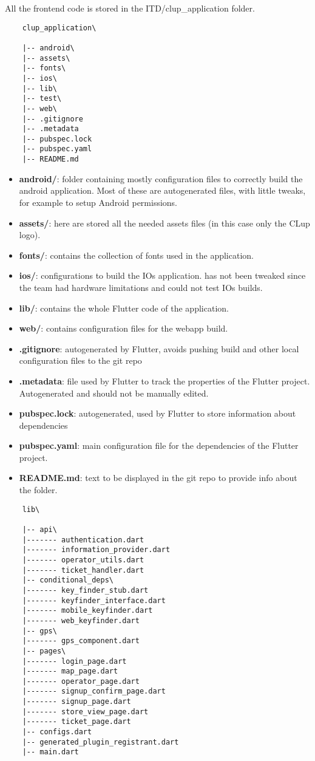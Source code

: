 All the frontend code is stored in the ITD/clup\_application folder.

\begin{lstlisting}
    clup_application\

    |-- android\
    |-- assets\
    |-- fonts\
    |-- ios\
    |-- lib\
    |-- test\
    |-- web\
    |-- .gitignore
    |-- .metadata
    |-- pubspec.lock
    |-- pubspec.yaml
    |-- README.md 

\end{lstlisting}

\begin{itemize}
    \item \textbf{android/}: folder containing mostly configuration files to correctly build the android application. Most of these are autogenerated files, with little tweaks, for example to setup Android permissions.
    \item \textbf{assets/}: here are stored all the needed assets files (in this case only the CLup logo).
    \item \textbf{fonts/}: contains the collection of fonts used in the application.
    \item \textbf{ios/}: configurations to build the IOs application. has not been tweaked since the team had hardware limitations and could not test IOs builds.
    \item \textbf{lib/}: contains the whole Flutter code of the application.
    \item \textbf{web/}: contains configuration files for the webapp build.
    \item \textbf{.gitignore}: autogenerated by Flutter, avoids pushing build and other local configuration files to the git repo
    \item \textbf{.metadata}: file used by Flutter to track the properties of the Flutter project. Autogenerated and should not be manually edited.
    \item \textbf{pubspec.lock}: autogenerated, used by Flutter to store information about dependencies
    \item \textbf{pubspec.yaml}: main configuration file for the dependencies of the Flutter project.
    \item \textbf{README.md}: text to be displayed in the git repo to provide info about the folder.
\end{itemize}

\begin{lstlisting}
    lib\

    |-- api\
    |------- authentication.dart
    |------- information_provider.dart
    |------- operator_utils.dart
    |------- ticket_handler.dart
    |-- conditional_deps\
    |------- key_finder_stub.dart
    |------- keyfinder_interface.dart
    |------- mobile_keyfinder.dart
    |------- web_keyfinder.dart
    |-- gps\
    |------- gps_component.dart
    |-- pages\
    |------- login_page.dart
    |------- map_page.dart
    |------- operator_page.dart
    |------- signup_confirm_page.dart
    |------- signup_page.dart
    |------- store_view_page.dart
    |------- ticket_page.dart
    |-- configs.dart
    |-- generated_plugin_registrant.dart
    |-- main.dart

\end{lstlisting}

